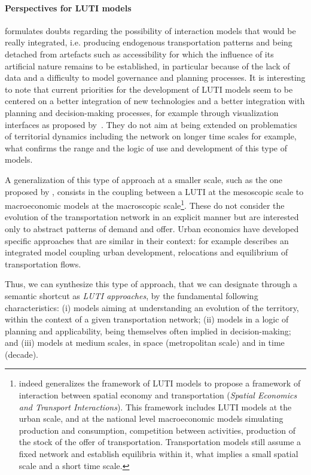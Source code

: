 \documentclass[galley]{jtlu-article-2col}
\begin{document}
\paragraph{Perspectives for LUTI models}

\cite{timmermans2003saga} formulates doubts regarding the possibility of interaction models that would be really integrated, i.e. producing endogenous transportation patterns and being detached from artefacts such as accessibility for which the influence of its artificial nature remains to be established, in particular because of the lack of data and a difficulty to model governance and planning processes. It is interesting to note that current priorities for the development of LUTI models seem to be centered on a better integration of new technologies and a better integration with planning and decision-making processes, for example through visualization interfaces as proposed by~\cite{JTLU611}. They do not aim at being extended on problematics of territorial dynamics including the network on longer time scales for example, what confirms the range and the logic of use and development of this type of models.

A generalization of this type of approach at a smaller scale, such as the one proposed by \cite{russo2012unifying}, consists in the coupling between a LUTI at the mesoscopic scale to macroeconomic models at the macroscopic scale\footnote{\cite{russo2012unifying} indeed generalizes the framework of LUTI models to propose a framework of interaction between spatial economy and transportation (\emph{Spatial Economics and Transport Interactions}). This framework includes LUTI models at the urban scale, and at the national level macroeconomic models simulating production and consumption, competition between activities, production of the stock of the offer of transportation. Transportation models still assume a fixed network and establish equilibria within it, what implies a small spatial scale and a short time scale.}. These do not consider the evolution of the transportation network in an explicit manner but are interested only to abstract patterns of demand and offer. Urban economics have developed specific approaches that are similar in their context: \cite{masso2000} for example describes an integrated model coupling urban development, relocations and equilibrium of transportation flows.

Thus, we can synthesize this type of approach, that we can designate through a semantic shortcut as \emph{LUTI approaches}, by the fundamental following characteristics: (i) models aiming at understanding an evolution of the territory, within the context of a given transportation network; (ii) models in a logic of planning and applicability, being themselves often implied in decision-making; and (iii) models at medium scales, in space (metropolitan scale) and in time (decade).
\end{document}
